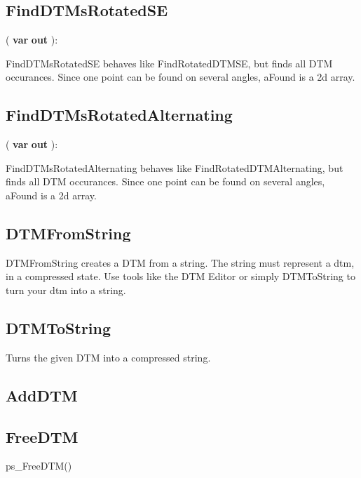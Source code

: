 \documentclass[a4paper]{report}
\begin{document}
\subsection{FindDTMsRotatedSE}
\pfunc {}( \textbf{var}
   
  \textbf{out}
 ): 

FindDTMsRotatedSE behaves like FindRotatedDTMSE, but finds all DTM occurances.
Since one point can be found on several angles, aFound is a 2d array.

\subsection{FindDTMsRotatedAlternating}
\pfunc {}( \textbf{var}
   
  \textbf{out}
 ): 

FindDTMsRotatedAlternating behaves like FindRotatedDTMAlternating,
but finds all DTM occurances.
Since one point can be found on several angles, aFound is a 2d array.

\subsection{DTMFromString}

DTMFromString creates a DTM from a string. The string must represent a dtm,
in a compressed state. Use tools like the DTM Editor or simply DTMToString to
turn your dtm into a string.

\subsection{DTMToString}

Turns the given DTM into a compressed string.

\subsection{AddDTM}

\subsection{FreeDTM}
\pproc ps\_FreeDTM()
\end{document}
